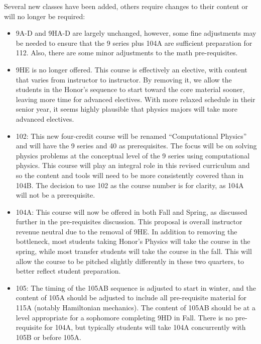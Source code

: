 \documentclass[12pt]{article}
\begin{document}
Several new classes have been added, others require changes to their content or will no longer be required:
\begin{itemize}
\item 9A-D and 9HA-D are largely unchanged, however, some fine adjustments may be needed to ensure that the 9 series plus 104A are sufficient preparation for 112.  Also, there are some minor adjustments to the math pre-requisites.

\item 9HE is no longer offered.  This course is effectively an elective, with content that varies from instructor to instructor.  By removing it, we allow the students in the Honor's sequence to start toward the core material sooner, leaving more time for advanced electives. With more relaxed schedule in their senior year, it seems highly plausible that physics majors will take more advanced electives.

\item 102:  This new four-credit course will be renamed ``Computational Physics'' and 
will have the 9 series and 40 as prerequisites.  The focus will be on solving physics problems at the conceptual level of the 9 series using computational physics.  This course will play an integral role in this revised curriculum and so the content and tools will need to be more consistently covered than in 104B.  The decision to use 102 as the course number is for clarity, as 104A will not be a prerequisite.

\item 104A:  This course will now be offered in both Fall and Spring, as discussed further in the pre-requisites discussion.  This proposal is overall instructor revenue neutral due to the removal of 9HE.  In addition to removing the bottleneck, most students taking Honor's Physics will take the course in the spring, while most transfer students will take the course in the fall.  This will allow the course to be pitched slightly differently in these two quarters, to better reflect student preparation.

\item 105:  The timing of the 105AB sequence is adjusted to start in winter, and the content of 105A should be adjusted to include all pre-requisite material for 115A (notably  Hamiltonian mechanics).  The content of 105AB should be at a level appropriate for a sophomore completing 9HD in Fall.  There is no pre-requisite for 104A, but typically students will take 104A concurrently with 105B or before 105A.


\end{itemize}
\end{document}
